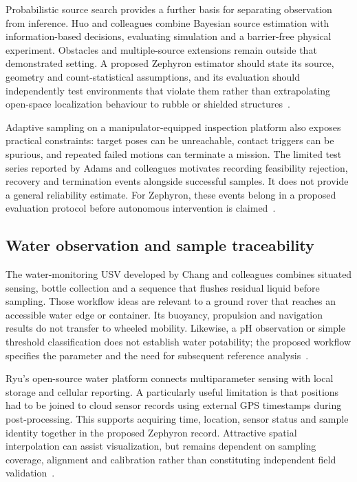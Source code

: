 \documentclass[11pt,letterpaper]{article}
\begin{document}
Probabilistic source search provides a further basis for separating observation from inference. Huo and colleagues combine Bayesian source estimation with information-based decisions, evaluating simulation and a barrier-free physical experiment. Obstacles and multiple-source extensions remain outside that demonstrated setting. A proposed Zephyron estimator should state its source, geometry and count-statistical assumptions, and its evaluation should independently test environments that violate them rather than extrapolating open-space localization behaviour to rubble or shielded structures~\cite{LIT_RADSEARCH2020}.

Adaptive sampling on a manipulator-equipped inspection platform also exposes practical constraints: target poses can be unreachable, contact triggers can be spurious, and repeated failed motions can terminate a mission. The limited test series reported by Adams and colleagues motivates recording feasibility rejection, recovery and termination events alongside successful samples. It does not provide a general reliability estimate. For Zephyron, these events belong in a proposed evaluation protocol before autonomous intervention is claimed~\cite{LIT_RADADAPT2025}.

\subsection{Water observation and sample traceability}

The water-monitoring USV developed by Chang and colleagues combines situated sensing, bottle collection and a sequence that flushes residual liquid before sampling. Those workflow ideas are relevant to a ground rover that reaches an accessible water edge or container. Its buoyancy, propulsion and navigation results do not transfer to wheeled mobility. Likewise, a pH observation or simple threshold classification does not establish water potability; the proposed workflow specifies the parameter and the need for subsequent reference analysis~\cite{LIT_WATER2021}.

Ryu's open-source water platform connects multiparameter sensing with local storage and cellular reporting. A particularly useful limitation is that positions had to be joined to cloud sensor records using external GPS timestamps during post-processing. This supports acquiring time, location, sensor status and sample identity together in the proposed Zephyron record. Attractive spatial interpolation can assist visualization, but remains dependent on sampling coverage, alignment and calibration rather than constituting independent field validation~\cite{LIT_IDRONE2022}.
\end{document}
